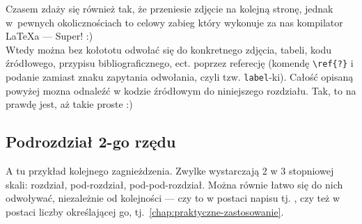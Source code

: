 Czasem zdaży się również tak, że przeniesie zdjęcie na kolejną stronę, jednak w~pewnych okolicznościach to celowy zabieg który wykonuje za nas kompilator LaTeXa --- Super! :) \\
Wtedy można bez kołototu odwołać się do konkretnego zdjęcia, tabeli, kodu źródłowego, przypisu bibliograficznego, ect. poprzez referecję (komendę \texttt{\textbackslash{}ref\{?\}} i podanie zamiast znaku zapytania odwołania, czyli tzw. \texttt{label}-ki). Całość opisaną powyżej mozna odnaleźć w kodzie źródłowym do niniejszego rozdziału. Tak, to na prawdę jest, aż takie proste :)

\subsection{Podrozdział 2-go rzędu}
\label{subsec:podrozdzial-2-rzedu}

A tu przykład kolejnego zagnieżdzenia. Zwylke wystarczają 2 w 3 stopniowej skali: rozdział, pod-rozdział, pod-pod-rozdział. Można równie łatwo się do nich odwoływać, niezależnie od kolejności --- czy to w postaci napisu tj. , czy też w postaci liczby określającej go, tj.~\ref{chap:praktyczne-zastosowanie}.